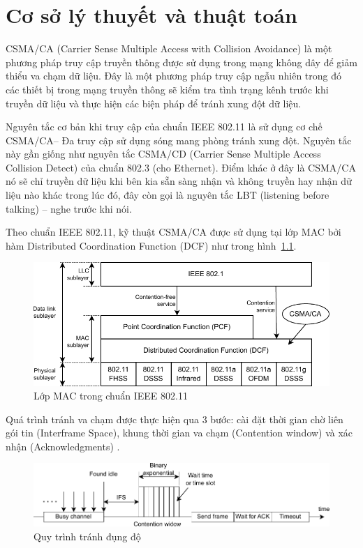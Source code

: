 \chapter{Cơ sở lý thuyết và thuật toán}
\label{ch::chapter2}

CSMA/CA (Carrier Sense Multiple Access with Collision Avoidance) là một phương pháp truy cập truyền 
thông được sử dụng trong mạng không dây để giảm thiểu va chạm dữ liệu. Đây là một phương pháp truy 
cập ngẫu nhiên trong đó các thiết bị trong mạng truyền thông sẽ kiểm tra tình trạng kênh trước khi 
truyền dữ liệu và thực hiện các biện pháp để tránh xung đột dữ liệu.

Nguyên tắc cơ bản khi truy cập của chuẩn IEEE 802.11 là sử dụng cơ chế CSMA/CA– Đa truy cập sử dụng sóng 
mang phòng tránh xung đột. Nguyên tắc này gần giống như nguyên tắc CSMA/CD (Carrier Sense Multiple 
Access Collision Detect) của chuẩn 802.3 (cho Ethernet). Điểm khác ở đây là CSMA/CA nó sẽ chỉ truyền 
dữ liệu khi bên kia sẵn sàng nhận và không truyền hay nhận dữ liệu nào khác trong lúc đó, đây còn gọi 
là nguyên tắc LBT (listening before talking) – nghe trước khi nói.

Theo chuẩn IEEE 802.11, kỹ thuật CSMA/CA được sử dụng tại lớp MAC bởi hàm Distributed Coordination Function (DCF) như trong hình~\ref{fig:mac}.
\begin{figure}[h]
    \centering
    \includegraphics[width=0.85\linewidth]{figures/Chapter2/MAClayer_k2opt.pdf}
    \caption{Lớp MAC trong chuẩn IEEE 802.11}
    \label{fig:mac}
\end{figure}

Quá trình tránh va chạm được thực hiện qua 3 bước: cài đặt thời gian chờ liên gói tin (Interframe Space), khung thời gian
va chạm (Contention window) và xác nhận (Acknowledgments) \cite{nam}.

\begin{figure}[h]
    \centering
    \includegraphics[width=1.1\linewidth]{figures/Chapter2/Procedure_k2opt.pdf}
    \caption{Quy trình tránh đụng độ}
    \label{fig:procedure}
\end{figure}

